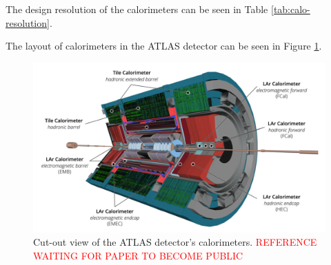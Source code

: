 		The design resolution of the calorimeters can be seen in Table \ref{tab:calo-resolution}.

		\begin{table}[!thp]
		\centering
		\caption{ Design resolution of EM and hadronic calorimeters in the \gls{ATLAS} Detector.}
		\label{tab:calo-resolution}
		\end{table}

		The layout of calorimeters in the \gls{ATLAS} detector can be seen in Figure \ref{fig:calo-layout}.
		\begin{figure}[!ht]
		\centering
		\includegraphics[width=.85\textwidth,keepaspectratio=true]{chapters/chapter3_experiment/images/ATLAS_Calorimeters_Run3.png}
		\caption{ Cut-out view of the \gls{ATLAS} detector's calorimeters. \textcolor{red}{REFERENCE WAITING FOR PAPER TO BECOME PUBLIC}}
		\label{fig:calo-layout}
		\end{figure}

